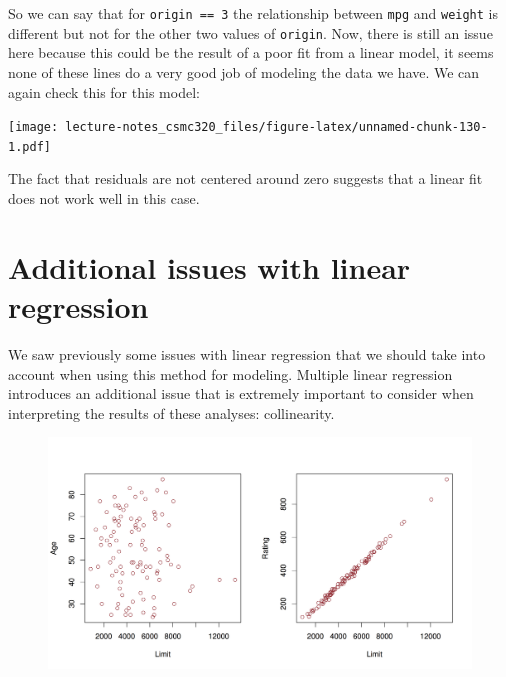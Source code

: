 \documentclass[12pt,]{book}
\newenvironment{Shaded}{\begin{snugshade}}{\end{snugshade}}
\newcommand{\KeywordTok}[1]{\textcolor[rgb]{0.13,0.29,0.53}{\textbf{#1}}}
\newcommand{\DataTypeTok}[1]{\textcolor[rgb]{0.13,0.29,0.53}{#1}}
\newcommand{\StringTok}[1]{\textcolor[rgb]{0.31,0.60,0.02}{#1}}
\newcommand{\OperatorTok}[1]{\textcolor[rgb]{0.81,0.36,0.00}{\textbf{#1}}}
\newcommand{\NormalTok}[1]{#1}
\theoremstyle{definition}
\theoremstyle{definition}
\theoremstyle{definition}
\theoremstyle{remark}
\begin{document}
So we can say that for \texttt{origin\ ==\ 3} the relationship between
\texttt{mpg} and \texttt{weight} is different but not for the other two
values of \texttt{origin}. Now, there is still an issue here because
this could be the result of a poor fit from a linear model, it seems
none of these lines do a very good job of modeling the data we have. We
can again check this for this model:

\begin{Shaded}
\end{Shaded}

\texttt{[image: lecture-notes\_csmc320\_files/figure-latex/unnamed-chunk-130-1.pdf]}

The fact that residuals are not centered around zero suggests that a
linear fit does not work well in this case.

\section{Additional issues with linear
regression}\label{additional-issues-with-linear-regression}

We saw previously some issues with linear regression that we should take
into account when using this method for modeling. Multiple linear
regression introduces an additional issue that is extremely important to
consider when interpreting the results of these analyses: collinearity.

\begin{figure}
\centering
\includegraphics{img/collinearity.png}
\caption{}
\end{figure}
\end{document}
